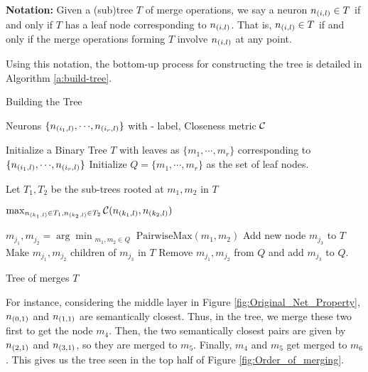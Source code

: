 \textbf{Notation:} Given a (sub)tree $T$ of
merge operations, we say a neuron $n_{(i,l)} \in T$ if and only if $T$ has a
leaf node corresponding to $n_{(i,l)}$. That is, $n_{(i,l)} \in T$ if and only
if the merge operations forming $T$ involve $n_{(i,l)}$ at any point.

Using this notation, the bottom-up process for constructing the tree is detailed
in Algorithm \ref{a:build-tree}.

\begin{algorithm}
\caption{Building the Tree}
\label{a:build-tree}
\begin{algorithmic}[1]

    \Require Neurons $\{n_{(i_1,l)}, {\cdots}, n_{(i_r,l)}\}$ with \inc-\dec
    label, Closeness metric $\mathcal{C}$

    
    \State Initialize a Binary Tree $T$ with leaves as
        $\{m_1, {\cdots}, m_r\}$ corresponding to $\{ n_{(i_1,l)}, {\cdots},
        n_{(i_r,l)} \}$
    \State Initialize $Q=\{m_1, {\cdots}, m_r\}$ as the set of leaf nodes.

        
            \State Let $T_1, T_2$ be the sub-trees rooted at $m_1, m_2$ in $T$

            \Return $\max_{n_{(k_1,l)} \in T_1, n_{(k_2,l)} \in T_2} 
                \mathcal{C}( n_{(k_1,l)}, n_{(k_2,l)} )$

    \EndFunction

        \State $m_{j_1}, m_{j_2} = \arg\min_{\substack{m_1, m_2 \in Q}} 
            \text{PairwiseMax}(m_1, m_2)$
        \State Add new node $m_{j_3}$ to $T$ 
        \State Make $m_{j_1}, m_{j_2}$ children of $m_{j_3}$ in $T$
        \State Remove $m_{j_1}, m_{j_2}$ from $Q$ and add $m_{j_3}$ to $Q$.
    \EndWhile

    \Ensure Tree of merges $T$
\end{algorithmic}
\end{algorithm}

For instance, considering the middle layer in Figure
\ref{fig:Original_Net_Property}, $n_{(0,1)}$ and $n_{(1,1)}$ are semantically
closest. Thus, in the tree, we merge these two first to get the node $m_4$.
Then, the two semantically closest pairs are given by $n_{(2,1)}$ and
$n_{(3,1)}$, so they are merged to $m_5$. Finally, $m_4$ and $m_5$ get merged
to $m_6$. This gives us the tree seen in the top half of Figure
\ref{fig:Order_of_merging}.

